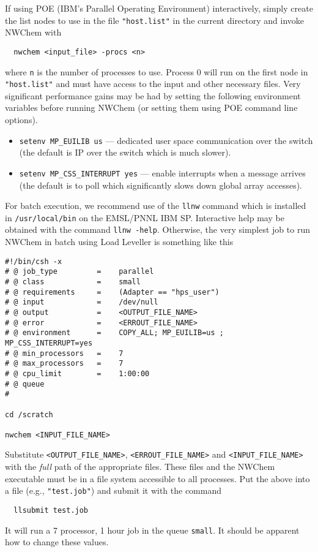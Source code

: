 If using POE (IBM's Parallel Operating Environment) interactively,
simply create the list nodes to use in the file \verb+"host.list"+ in
the current directory and invoke NWChem with
\begin{verbatim}
  nwchem <input_file> -procs <n>
\end{verbatim}
where \verb+n+ is the number of processes to use.  Process 0 will run
on the first node in \verb+"host.list"+ and must have access to the
input and other necessary files.  Very significant performance gains
may be had by setting the following environment variables before
running NWChem (or setting them using POE command line options).
\begin{itemize}
\item \verb+setenv MP_EUILIB us+ --- dedicated user space
  communication over the switch (the default is IP over the switch
  which is much slower).
\item \verb+setenv MP_CSS_INTERRUPT yes+ --- enable interrupts when a 
  message arrives (the default is to poll which significantly slows
  down global array accesses).
\end{itemize}

For batch execution, we recommend use of the \verb+llnw+ command which
is installed in \verb+/usr/local/bin+ on the EMSL/PNNL IBM SP.
Interactive help may be obtained with the command \verb+llnw -help+.
Otherwise, the very simplest job to run NWChem in batch using Load
Leveller is something like this
\begin{verbatim}
#!/bin/csh -x
# @ job_type         =    parallel
# @ class            =    small
# @ requirements     =    (Adapter == "hps_user")
# @ input            =    /dev/null
# @ output           =    <OUTPUT_FILE_NAME>
# @ error            =    <ERROUT_FILE_NAME>
# @ environment      =    COPY_ALL; MP_EUILIB=us ; MP_CSS_INTERRUPT=yes
# @ min_processors   =    7
# @ max_processors   =    7
# @ cpu_limit        =    1:00:00
# @ queue
#

cd /scratch

nwchem <INPUT_FILE_NAME>
\end{verbatim}

Substitute \verb+<OUTPUT_FILE_NAME>+, \verb+<ERROUT_FILE_NAME>+ and
\verb+<INPUT_FILE_NAME>+ with the {\em full} path of the appropriate
files.  These files and the NWChem executable must be in a file system
accessible to all processes.  Put the above into a file (e.g.,
\verb+"test.job"+) and submit it with the command
\begin{verbatim}
  llsubmit test.job
\end{verbatim}
It will run a 7 processor, 1 hour job in the queue \verb+small+.  It
should be apparent how to change these values.

